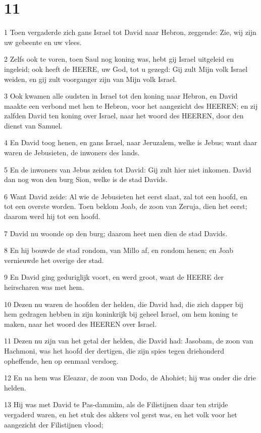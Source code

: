 \chapter{11}

\par 1 Toen vergaderde zich gans Israel tot David naar Hebron, zeggende: Zie, wij zijn uw gebeente en uw vlees.
\par 2 Zelfs ook te voren, toen Saul nog koning was, hebt gij Israel uitgeleid en ingeleid; ook heeft de HEERE, uw God, tot u gezegd: Gij zult Mijn volk Israel weiden, en gij zult voorganger zijn van Mijn volk Israel.
\par 3 Ook kwamen alle oudsten in Israel tot den koning naar Hebron, en David maakte een verbond met hen te Hebron, voor het aangezicht des HEEREN; en zij zalfden David ten koning over Israel, naar het woord des HEEREN, door den dienst van Samuel.
\par 4 En David toog henen, en gans Israel, naar Jeruzalem, welke is Jebus; want daar waren de Jebusieten, de inwoners des lands.
\par 5 En de inwoners van Jebus zeiden tot David: Gij zult hier niet inkomen. David dan nog won den burg Sion, welke is de stad Davids.
\par 6 Want David zeide: Al wie de Jebusieten het eerst slaat, zal tot een hoofd, en tot een overste worden. Toen beklom Joab, de zoon van Zeruja, dien het eerst; daarom werd hij tot een hoofd.
\par 7 David nu woonde op den burg; daarom heet men dien de stad Davids.
\par 8 En hij bouwde de stad rondom, van Millo af, en rondom henen; en Joab vernieuwde het overige der stad.
\par 9 En David ging geduriglijk voort, en werd groot, want de HEERE der heirscharen was met hem.
\par 10 Dezen nu waren de hoofden der helden, die David had, die zich dapper bij hem gedragen hebben in zijn koninkrijk bij geheel Israel, om hem koning te maken, naar het woord des HEEREN over Israel.
\par 11 Dezen nu zijn van het getal der helden, die David had: Jasobam, de zoon van Hachmoni, was het hoofd der dertigen, die zijn spies tegen driehonderd opheffende, hen op eenmaal versloeg.
\par 12 En na hem was Eleazar, de zoon van Dodo, de Ahohiet; hij was onder die drie helden.
\par 13 Hij was met David te Pas-dammim, als de Filistijnen daar ten strijde vergaderd waren, en het stuk des akkers vol gerst was, en het volk voor het aangezicht der Filistijnen vlood;
